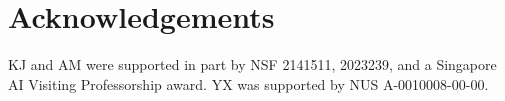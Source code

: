 \section*{Acknowledgements}
KJ and AM were supported in part by NSF 2141511, 2023239, and a Singapore AI Visiting Professorship award.  YX was supported by NUS A-0010008-00-00. 